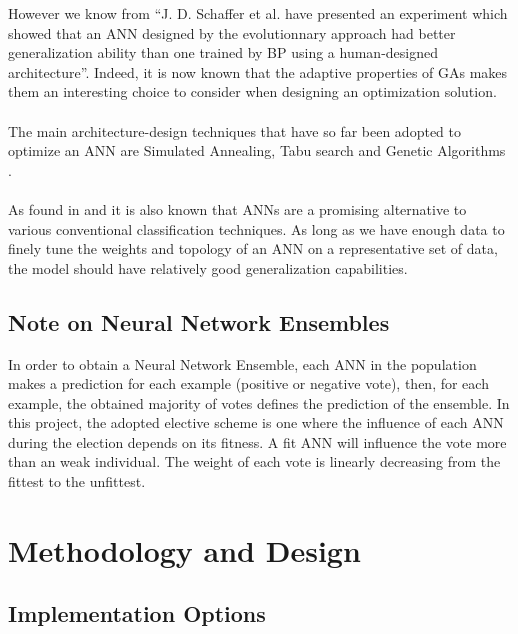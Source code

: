 \documentclass[a4paper,12pt, oneside]{memoir}
\begin{document}
However we know from \cite{yao-1999} ``J. D. Schaffer et al. \cite{schaffer-1990} have presented an experiment which showed that an ANN designed by the evolutionnary approach had better generalization ability than one trained by BP using a human-designed architecture''. Indeed, it is now known that the adaptive properties of GAs makes them an interesting choice to consider when designing an optimization solution.
\\
\\
The main architecture-design techniques that have so far been adopted to optimize an ANN are Simulated Annealing, Tabu search and Genetic Algorithms \cite{tereza-2006}.
\\
\\
As found in \cite{zhang-2000} and \cite{waghulde-2014} it is also known that ANNs are a promising alternative to various conventional classification techniques. As long as we have enough data to finely tune the weights and topology of an ANN on a representative set of data, the model should have relatively good generalization capabilities.

\section{Note on Neural Network Ensembles}

In order to obtain a Neural Network Ensemble, each ANN in the population makes a prediction for each example (positive or negative vote), then, for each example, the obtained majority of votes defines the prediction of the ensemble. In this project, the adopted elective scheme is one where the influence of each ANN during the election depends on its fitness. A fit ANN will influence the vote more than an weak individual. The weight of each vote is linearly decreasing from the fittest to the unfittest.

\chapter{Methodology and Design}

\section{Implementation Options}
\end{document}
